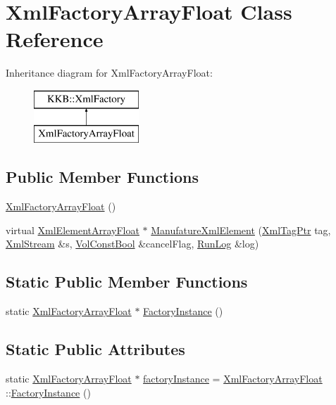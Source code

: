 \hypertarget{class_xml_factory_array_float}{}\section{Xml\+Factory\+Array\+Float Class Reference}
\label{class_xml_factory_array_float}
Inheritance diagram for Xml\+Factory\+Array\+Float\+:\begin{figure}[H]
\begin{center}
\leavevmode
\includegraphics[height=2.000000cm]{class_xml_factory_array_float}
\end{center}
\end{figure}
\subsection*{Public Member Functions}
\begin{DoxyCompactItemize}
\item 
\hyperlink{class_xml_factory_array_float_acdb1992f19e36ae8b69642014f9b3655}{Xml\+Factory\+Array\+Float} ()
\item 
virtual \hyperlink{class_k_k_b_1_1_xml_element_array_float}{Xml\+Element\+Array\+Float} $\ast$ \hyperlink{class_xml_factory_array_float_af24bdcb9ab600675628651df0ad6f2d6}{Manufature\+Xml\+Element} (\hyperlink{namespace_k_k_b_a9253a3ea8a5da18ca82be4ca2b390ef0}{Xml\+Tag\+Ptr} tag, \hyperlink{class_k_k_b_1_1_xml_stream}{Xml\+Stream} \&s, \hyperlink{namespace_k_k_b_a7d390f568e2831fb76b86b56c87bf92f}{Vol\+Const\+Bool} \&cancel\+Flag, \hyperlink{class_k_k_b_1_1_run_log}{Run\+Log} \&log)
\end{DoxyCompactItemize}
\subsection*{Static Public Member Functions}
\begin{DoxyCompactItemize}
\item 
static \hyperlink{class_xml_factory_array_float}{Xml\+Factory\+Array\+Float} $\ast$ \hyperlink{class_xml_factory_array_float_a8a9481371c56c77956cf9133a5d35def}{Factory\+Instance} ()
\end{DoxyCompactItemize}
\subsection*{Static Public Attributes}
\begin{DoxyCompactItemize}
\item 
static \hyperlink{class_xml_factory_array_float}{Xml\+Factory\+Array\+Float} $\ast$ \hyperlink{class_xml_factory_array_float_a45144c91583a0355a8960a360d1f20e6}{factory\+Instance} = \hyperlink{class_xml_factory_array_float}{Xml\+Factory\+Array\+Float} \+::\hyperlink{class_xml_factory_array_float_a8a9481371c56c77956cf9133a5d35def}{Factory\+Instance} ()
\end{DoxyCompactItemize}



